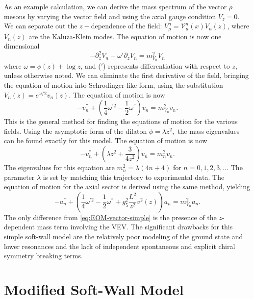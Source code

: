 As an example calculation, we can derive the mass spectrum of the vector $\rho$ mesons by varying the vector field and using the axial gauge condition $V_{z}=0.$ 
We can separate out the $z-$dependence of the field: $V_{\mu}^{n}=\mathcal{V}_{\mu}^{n}(x)V_{n}(z)$, where$V_{n}(z)$ are the Kaluza-Klein modes. 
The equation of motion is now one dimensional
\begin{equation}
-\partial_{z}^{2}V_{n}+\omega'\partial_{z}V_{n}=m_{V_{n}}^{2}V_{n}\label{eq:vectorEOM1}
\end{equation}
where $\omega=\phi(z)+\log z$, and ($'$) represents differentiation with respect to $z,$ unless otherwise noted. 
We can eliminate the first derivative of the field, bringing the equation of motion into Schrodinger-like form, using the substitution $V_{n}(z)=e^{\omega/2}v_{n}(z)$.
The equation of motion is now
\begin{equation}
-v_{n}^{''}+\left(\frac{1}{4}\omega^{'2}-\frac{1}{2}\omega^{''}\right)v_{n}=m_{V_{n}}^{2}v_{n}.\label{eq:EOM-vector-simple}
\end{equation}
This is the general method for finding the equations of motion for the various fields. 
Using the asymptotic form of the dilaton $\phi=\lambda z^{2},$ the mass eigenvalues can be found exactly for this model. The equation of motion is now
\begin{equation}
-v_{n}^{''}+\left(\lambda z^{2}+\frac{3}{4z^{2}}\right)v_{n}=m_{n}^{2}v_{n}.
\end{equation}
The eigenvalues for this equation are $m_{n}^{2}=\lambda(4n+4)$ for $n=0,1,2,3,\dots$ 
The parameter $\lambda$ is set by matching this trajectory to experimental data. 
The equation of motion for the axial sector is derived using the same method, yielding
\begin{equation}
-a_{n}^{''}+\left(\frac{1}{4}\omega^{'2}-\frac{1}{2}\omega^{''}+g_{5}^{2}\frac{L^{2}}{z^{2}}v^{2}(z)\right)a_{n}=m_{V_{n}}^{2}a_{n}.\label{eq:EOM-axial-simple}
\end{equation}
The only difference from \eqref{eq:EOM-vector-simple} is the presence of the $z$-dependent mass term involving the VEV. 
The significant drawbacks for this simple soft-wall model are the relatively poor modeling of the ground state and lower resonances and the lack of independent spontaneous and explicit chiral symmetry
breaking terms.


\section{Modified Soft-Wall Model\label{sub:Modified-Soft-Wall-Model}}

